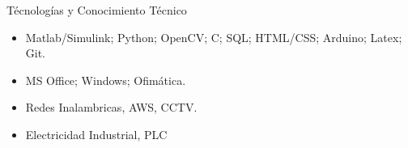 \documentclass[]{mcdowellcv}
\begin{document}
	\begin{cvsection}{Técnologías y Conocimiento Técnico}
		\begin{cvsubsection}{}{}{}	
			\begin{itemize}
				\item Matlab/Simulink; Python; OpenCV; C; SQL; HTML/CSS; Arduino; Latex; Git.
				\item MS Office; Windows; Ofimática.
				\item Redes Inalambricas, AWS, CCTV.
				\item Electricidad Industrial, PLC
			\end{itemize}
		\end{cvsubsection}
	\end{cvsection}
	
\end{document}
